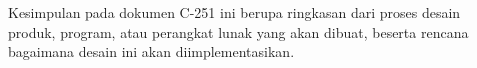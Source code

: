 Kesimpulan pada dokumen C-251 ini berupa ringkasan dari proses desain produk, program, atau perangkat lunak yang akan dibuat, beserta rencana bagaimana desain ini akan diimplementasikan.